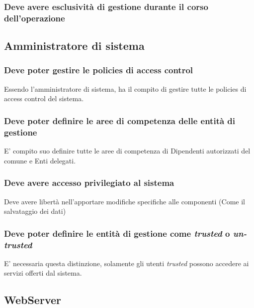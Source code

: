 \documentclass{article}
\begin{document}
\subsubsection{Deve avere esclusività di gestione durante il corso dell'operazione}

\subsection{Amministratore di sistema}

\subsubsection{Deve poter gestire le policies di access control}
Essendo l'amministratore di sistema, ha il compito di gestire tutte le policies di access control del sistema.

\subsubsection{Deve poter definire le aree di competenza delle entità di gestione}
E' compito suo definire tutte le aree di competenza di Dipendenti autorizzati del comune e Enti delegati.

\subsubsection{Deve avere accesso privilegiato al sistema}
Deve avere libertà nell'apportare modifiche specifiche alle componenti (Come il salvataggio dei dati)

\subsubsection{Deve poter definire le entità di gestione come \textit{trusted} o \textit{un-trusted}}
E' necessaria questa distinzione, solamente gli utenti \textit{trusted} possono accedere ai servizi offerti dal sistema.

\subsection{WebServer}
\end{document}
